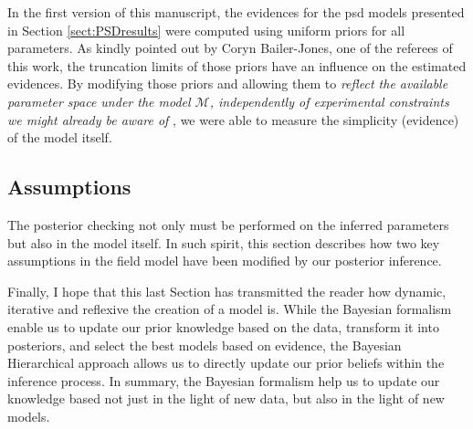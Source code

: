 In the first version of this manuscript, the evidences for the \gls{psd} models presented in Section \ref{sect:PSDresults} were computed using uniform priors for all parameters. As kindly pointed out by Coryn Bailer-Jones, one of the referees of this work, the truncation limits of those priors have an influence on the estimated evidences. By modifying those priors and allowing them to \textit{reflect the available parameter space under the model $\mathcal{M}$, independently of experimental constraints we might already be aware of} \cite[taken from][]{Trotta2008}, we were able to measure the simplicity (evidence) of the model itself. 

\subsection{Assumptions}
The posterior checking not only must be performed on the inferred parameters but also in the model itself. In such spirit, this section describes how two key assumptions in the field model have been modified by our posterior inference.



Finally, I hope that this last Section has transmitted the reader how dynamic, iterative and reflexive the creation of a model is. While the Bayesian formalism enable us to update our prior knowledge based on the data, transform it into posteriors, and select the best models based on evidence, the Bayesian Hierarchical approach allows us to directly update our prior beliefs within the inference process. In summary, the Bayesian formalism help us to update our knowledge based not just in the light of new data, but also in the light of new models.
 




